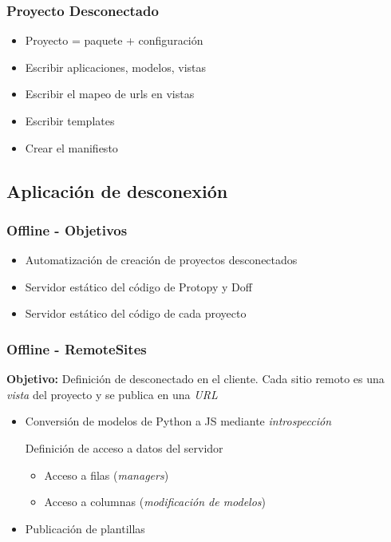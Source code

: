 \documentclass{beamer}
\begin{document}
\begin{frame}
    \frametitle{Proyecto Desconectado}
    \begin{itemize}
        \item{Proyecto = paquete + configuración}
        \item{Escribir aplicaciones, modelos, vistas}
        \item{Escribir el mapeo de urls en vistas}
        \item{Escribir templates}
        \item{Crear el manifiesto}
    \end{itemize}
\end{frame}


\subsection{Aplicación de desconexión}
\begin{frame}
    \frametitle{Offline - Objetivos}
    \begin{itemize}
        \item{Automatización de creación de proyectos desconectados}
        \item{Servidor estático del código de Protopy y Doff}
        \item{Servidor estático del código de cada proyecto}
    \end{itemize}
\end{frame}

\begin{frame}

    \frametitle{Offline - RemoteSites}
    \par{
        \par{\bf Objetivo:}
        Definición de desconectado en el cliente. Cada sitio remoto es una {\it vista}
        del proyecto y se publica en una {\it URL}

    }
    \begin{itemize}
      \item{Conversión de modelos de Python a JS mediante {\it introspección}}
      \begin{item}Definición de acceso a datos del servidor
        \begin{itemize}
          \item {Acceso a filas ({\it managers})}
          \item {Acceso a columnas ({\it modificación de modelos})}
        \end{itemize}
      \end{item}
      \item{Publicación de plantillas}
    \end{itemize}

\end{frame}
\end{document}
